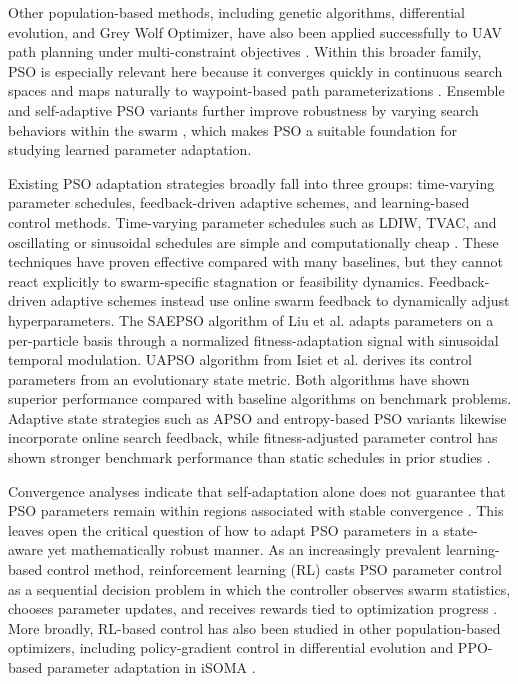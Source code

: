 \documentclass[final,5p,times]{elsarticle}
\begin{document}
Other population-based methods, including genetic algorithms, differential evolution, and Grey Wolf Optimizer, have also been applied successfully to UAV path planning under multi-constraint objectives \cite{Debnath2024An, AitSaadi2022UAV}.
Within this broader family, PSO is especially relevant here because it converges quickly in continuous search spaces and maps naturally to waypoint-based path parameterizations \cite{Cheng2024Research, Phung2021Safetyenhanced}.
Ensemble and self-adaptive PSO variants further improve robustness by varying search behaviors within the swarm \cite{Lynn2017Ensemble}, which makes PSO a suitable foundation for studying learned parameter adaptation.

Existing PSO adaptation strategies broadly fall into three groups: time-varying parameter schedules, feedback-driven adaptive schemes, and learning-based control methods.
Time-varying parameter schedules such as LDIW, TVAC, and oscillating or sinusoidal schedules are simple and computationally cheap \cite{Eberhart2000Comparing, Ratnaweera2004Selforganizing, Nickabadi2011A, Kentzoglanakis2009Particle, Chen2018A}.
These techniques have proven effective compared with many baselines, but they cannot react explicitly to swarm-specific stagnation or feasibility dynamics.
Feedback-driven adaptive schemes instead use online swarm feedback to dynamically adjust hyperparameters.
The SAEPSO algorithm of Liu et al. \cite{Liu2025A} adapts parameters on a per-particle basis through a normalized fitness-adaptation signal with sinusoidal temporal modulation.
UAPSO algorithm from Isiet et al. \cite{Isiet2019Selfadapting} derives its control parameters from an evolutionary state metric.
Both algorithms have shown superior performance compared with baseline algorithms on benchmark problems.
Adaptive state strategies such as APSO \cite{Zhan2009Adaptive} and entropy-based PSO variants \cite{Han2022Improved} likewise incorporate online search feedback, while fitness-adjusted parameter control has shown stronger benchmark performance than static schedules in prior studies \cite{Li2017Particle}.

Convergence analyses indicate that self-adaptation alone does not guarantee that PSO parameters remain within regions associated with stable convergence \cite{Harrison2018Selfadaptive}. 
This leaves open the critical question of how to adapt PSO parameters in a state-aware yet mathematically robust manner.
As an increasingly prevalent learning-based control method, reinforcement learning (RL) casts PSO parameter control as a sequential decision problem in which the controller observes swarm statistics, chooses parameter updates, and receives rewards tied to optimization progress \cite{Sutton2018Reinforcement, Bai2023Evolutionary}.
More broadly, RL-based control has also been studied in other population-based optimizers, including policy-gradient control in differential evolution and PPO-based parameter adaptation in iSOMA \cite{Sun2021Learning, Klein2024Optimizing}.
\end{document}
